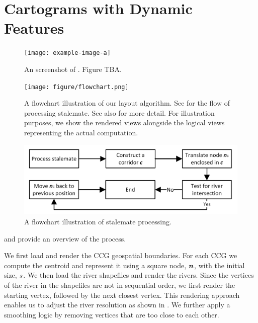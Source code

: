 \section{Cartograms with Dynamic Features}

 {
  \begin{figure}[tb!]
      \centering
      \texttt{[image: example-image-a]}
      \caption{An screenshot of \software. Figure TBA.}
      \label{fig:overview}
  \end{figure}
 }

 {
  \begin{figure}[tb!]
      \centering
      \texttt{[image: figure/flowchart.png]}
      \caption{A flowchart illustration of our layout algorithm. See  for the flow of processing stalemate. See also  for more detail. For illustration purposes, we show the rendered views alongside the logical views representing the actual computation.}
      \label{fig:flowchart}
  \end{figure}

  \begin{figure}[tb!]
      \centering
      \includegraphics[width=0.9\columnwidth,keepaspectratio]{figure/flowchart stalemate.png}
      \caption{A flowchart illustration of stalemate processing.}
      \label{fig:flowchart-stalemate}
  \end{figure}
 }

 and  provide an overview of the process.

 We first load and render the CCG geospatial boundaries. For each CCG we compute the centroid and represent it using a square node, $ \bm{n} $, with the initial size, $ s $. We then load the river shapefiles and render the rivers. Since the vertices of the river in the shapefiles are not in sequential order, we first render the starting vertex, followed by the next closest vertex. This rendering approach enables us to adjust the river resolution as shown in . We further apply a smoothing logic by removing vertices that are too close to each other.

